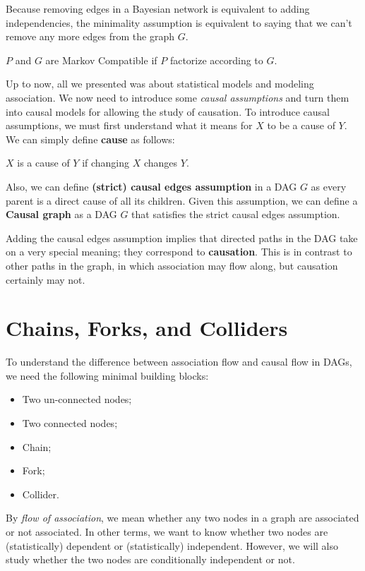 Because removing edges in a Bayesian network is equivalent to adding independencies,
the minimality assumption is equivalent to saying that we can't remove any more
edges from the graph $G$.

\begin{definition}
    $P$ and $G$ are Markov Compatible if $P$ factorize according to $G$.
\end{definition}

Up to now, all we presented was about statistical models and modeling association.
We now need to introduce some \textit{causal assumptions} and turn them into causal
models for allowing the study of causation. To introduce causal assumptions,
we must first understand what it means for $X$ to be a cause of $Y$. We can simply
define \textbf{cause} as follows:
\begin{definition}
    $X$ is a cause of $Y$ if changing $X$ changes $Y$.
\end{definition}

Also, we can define \textbf{(strict) causal edges assumption} in a DAG $G$ as
every parent is a direct cause of all its children. Given this assumption, we can
define a \textbf{Causal graph} as a DAG $G$ that satisfies the strict causal edges
assumption.

Adding the causal edges assumption implies that directed paths in the DAG take
on a very special meaning; they correspond to \textbf{causation}. This is in
contrast to other paths in the graph, in which association may flow along, but
causation certainly may not.
\section{Chains, Forks, and Colliders}
To understand the difference between association flow and causal flow in DAGs,
we need the following minimal building blocks:
\begin{itemize}
    \item Two un-connected nodes;
    \item Two connected nodes;
    \item Chain;
    \item Fork;
    \item Collider.
\end{itemize}

By \textit{flow of association}, we mean whether any two nodes in a graph are
associated or not associated. In other terms, we want to know whether two nodes
are (statistically) dependent or (statistically) independent. However, we will
also study whether the two nodes are conditionally independent or not.
